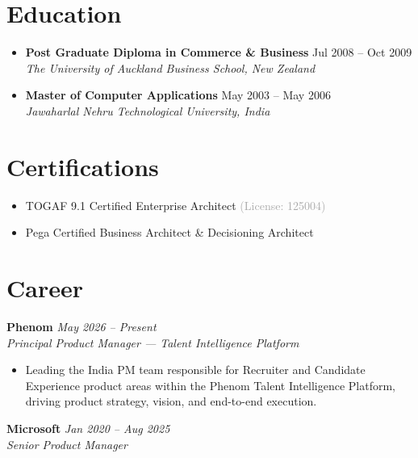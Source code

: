 \documentclass{article}
\newcommand{\job}[3]{%
    \vspace{6pt}%
    {\textbf{#1} \hfill \textit{#3}}\\[1pt]%
    {\textit{#2}}\par%
    \vspace{2pt}%
}
\begin{document}
\section{Education}

\begin{itemize}
    \item \textbf{Post Graduate Diploma in Commerce \& Business} \hfill Jul 2008 -- Oct 2009 \\
          \emph{The University of Auckland Business School, New Zealand}

    \item \textbf{Master of Computer Applications} \hfill May 2003 -- May 2006 \\
          \emph{Jawaharlal Nehru Technological University, India}
\end{itemize}

\section{Certifications}

\begin{itemize}
    \item TOGAF 9.1 Certified Enterprise Architect \textcolor{darkgray}{(License: 125004)}
    \item Pega Certified Business Architect \& Decisioning Architect
\end{itemize}

\section{Career}

\job{Phenom}{Principal Product Manager — Talent Intelligence Platform}{May 2026 -- Present}
\begin{itemize}
    \item Leading the India PM team responsible for Recruiter and Candidate Experience product areas within the Phenom Talent Intelligence Platform, driving product strategy, vision, and end-to-end execution.
\end{itemize}

\job{Microsoft}{Senior Product Manager}{Jan 2020 -- Aug 2025}
\end{document}
